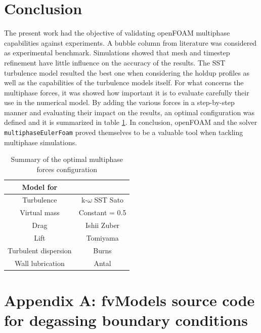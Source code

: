 \documentclass[11pt,a4paper]{article}
\begin{document}
\section{Conclusion}
\label{sec:Conclusion}

The present work had the objective of validating openFOAM multiphase capabilities against experiments. A bubble column from literature was considered as experimental benchmark. Simulations showed that mesh and timestep refinement have little influence on the accuracy of the results. The SST turbulence model resulted the best one when considering the holdup profiles as well as the capabilities of the turbulence models itself. For what concerns the multiphase forces, it was showed how important it is to evaluate carefully their use in the numerical model. By adding the various forces in a step-by-step manner and evaluating their impact on the results, an optimal configuration was defined and it is summarized in table \ref{tab:optimalconfig}. In conclusion, openFOAM and the solver \texttt{multiphaseEulerFoam} proved themselves to be a valuable tool when tackling multiphase simulations.



\begin{table}[H]
  \centering
    \begin{tabular}{| c c |}
    \hline
    \rowcolor{bluePoli!40}
    \textbf{Model for} &  \T\B \\
     \hline \hline 
    Turbulence & k-$\omega$ SST Sato \cite{SSTSato} \T\B \\
    Virtual mass & Constant = 0.5 \T\B \\
    Drag & Ishii Zuber \cite{ishiizuber} \T\B \\
    Lift & Tomiyama \cite{tomiyamalift} \T\B \\  
    Turbulent dispersion & Burns \cite{burns} \T\B \\   
    Wall lubrication & Antal \cite{antal} \T\B \\ 
    \hline
    \end{tabular}%
  \caption{Summary of the optimal multiphase forces configuration}
  \label{tab:optimalconfig}%
\end{table}%









\clearpage


\appendix
\section{Appendix A: fvModels source code for degassing boundary conditions}
\label{app:A}



\cleardoublepage
\end{document}
